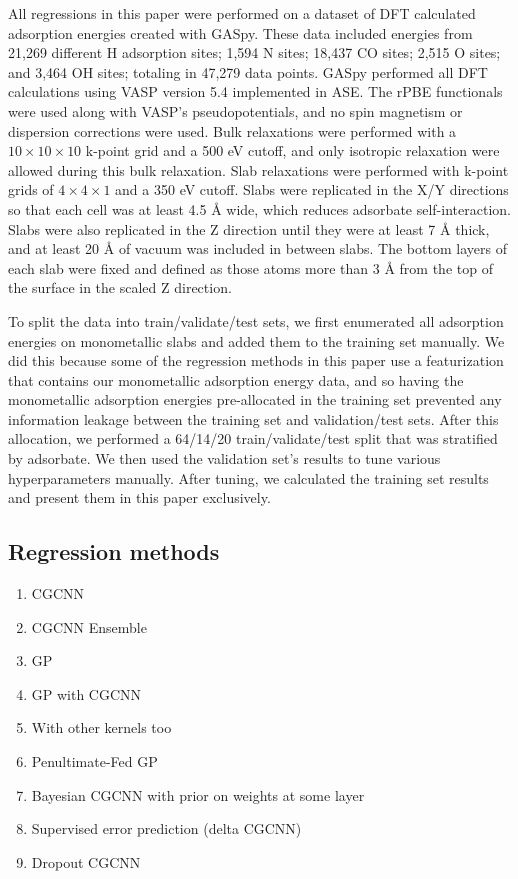 \documentclass[]{achemso}
\begin{document}
All regressions in this paper were performed on a dataset of \gls{DFT} calculated adsorption energies created with \gls{GASpy}\cite{Tran2018, Tran2018a}.
These data included energies from 21,269 different H adsorption sites; 1,594 N sites; 18,437 CO sites; 2,515 O sites; and 3,464 OH sites; totaling in 47,279 data points.
\gls{GASpy} performed all \gls{DFT} calculations using \gls{VASP}\cite{Kresse1993, Kresse1994, Kresse1996, Kresse1996a} version 5.4 implemented in \gls{ASE}\cite{HjorthLarsen2017}.
The \gls{rPBE} functionals\cite{Hammer1999} were used along with \gls{VASP}'s pseudopotentials, and no spin magnetism or dispersion corrections were used.
Bulk relaxations were performed with a $10\times10\times10$ k-point grid and a 500 eV cutoff, and only isotropic relaxation were allowed during this bulk relaxation.
Slab relaxations were performed with k-point grids of $4\times4\times1$ and a 350 eV cutoff.
Slabs were replicated in the X/Y directions so that each cell was at least 4.5 \AA{} wide, which reduces adsorbate self-interaction.
Slabs were also replicated in the Z direction until they were at least 7 \AA{} thick, and at least 20 \AA{} of vacuum was included in between slabs.
The bottom layers of each slab were fixed and defined as those atoms more than 3 \AA{} from the top of the surface in the scaled Z direction.

To split the data into train/validate/test sets, we first enumerated all adsorption energies on monometallic slabs and added them to the training set manually. 
We did this because some of the regression methods in this paper use a featurization that contains our monometallic adsorption energy data\cite{Tran2018}, and so having the monometallic adsorption energies pre-allocated in the training set prevented any information leakage between the training set and validation/test sets.
After this allocation, we performed a 64/14/20 train/validate/test split that was stratified\cite{Thompson2012} by adsorbate.
We then used the validation set's results to tune various hyperparameters manually.
After tuning, we calculated the training set results and present them in this paper exclusively.

\subsection{Regression methods}

\begin{enumerate}
    \item{CGCNN}
    \item{CGCNN Ensemble}
    \item{GP}
    \item{GP with CGCNN}
    \item{With other kernels too}
    \item{Penultimate-Fed GP}
    \item{Bayesian CGCNN with prior on weights at some layer}
    \item{Supervised error prediction (delta CGCNN)}
    \item{Dropout CGCNN}
\end{enumerate}
\end{document}
